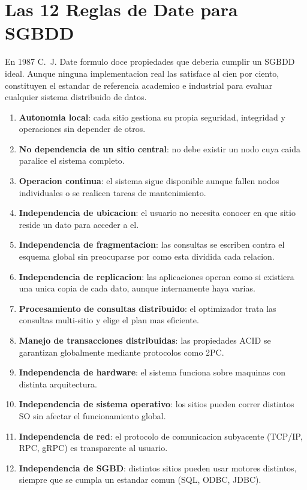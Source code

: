 \documentclass[11pt,a4paper]{article}
\begin{document}
\section{Las 12 Reglas de Date para SGBDD}

En 1987 C.~J. Date formulo doce propiedades que deberia cumplir un SGBDD ideal. Aunque ninguna implementacion real las satisface al cien por ciento, constituyen el estandar de referencia academico e industrial para evaluar cualquier sistema distribuido de datos.

\begin{enumerate}[label=\textbf{R\arabic*.},leftmargin=*]
\item \textbf{Autonomia local}: cada sitio gestiona su propia seguridad, integridad y operaciones sin depender de otros.
\item \textbf{No dependencia de un sitio central}: no debe existir un nodo cuya caida paralice el sistema completo.
\item \textbf{Operacion continua}: el sistema sigue disponible aunque fallen nodos individuales o se realicen tareas de mantenimiento.
\item \textbf{Independencia de ubicacion}: el usuario no necesita conocer en que sitio reside un dato para acceder a el.
\item \textbf{Independencia de fragmentacion}: las consultas se escriben contra el esquema global sin preocuparse por como esta dividida cada relacion.
\item \textbf{Independencia de replicacion}: las aplicaciones operan como si existiera una unica copia de cada dato, aunque internamente haya varias.
\item \textbf{Procesamiento de consultas distribuido}: el optimizador trata las consultas multi-sitio y elige el plan mas eficiente.
\item \textbf{Manejo de transacciones distribuidas}: las propiedades ACID se garantizan globalmente mediante protocolos como 2PC.
\item \textbf{Independencia de hardware}: el sistema funciona sobre maquinas con distinta arquitectura.
\item \textbf{Independencia de sistema operativo}: los sitios pueden correr distintos SO sin afectar el funcionamiento global.
\item \textbf{Independencia de red}: el protocolo de comunicacion subyacente (TCP/IP, RPC, gRPC) es transparente al usuario.
\item \textbf{Independencia de SGBD}: distintos sitios pueden usar motores distintos, siempre que se cumpla un estandar comun (SQL, ODBC, JDBC).
\end{enumerate}
\end{document}

